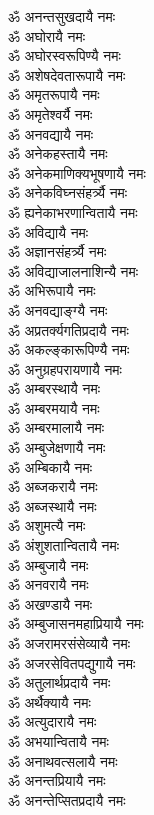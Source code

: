 \begin{flushleft}
\begin{multicols}{2}
ॐ अनन्तसुखदायै नमः\\
ॐ अघोरायै नमः\\
ॐ अघोरस्वरूपिण्यै नमः\\
ॐ अशेषदेवतारूपायै नमः\\
ॐ अमृतरूपायै नमः\\
ॐ अमृतेश्वर्यै नमः\\
ॐ अनवद्यायै नमः\\
ॐ अनेकहस्तायै नमः\hfill{}\\
ॐ अनेकमाणिक्यभूषणायै नमः\\
ॐ अनेकविघ्नसंहर्त्र्यै नमः\\
ॐ ह्यनेकाभरणान्वितायै नमः\\
ॐ अविद्यायै नमः\\
ॐ अज्ञानसंहर्त्र्यै नमः\\
ॐ अविद्याजालनाशिन्यै नमः\\
ॐ अभिरूपायै नमः\\
ॐ अनवद्याङ्ग्यै नमः\\
ॐ अप्रतर्क्यगतिप्रदायै नमः\\
ॐ अकल्ङ्कारूपिण्यै नमः\hfill{}\\
ॐ अनुग्रहपरायणायै नमः\\
ॐ अम्बरस्थायै नमः\\
ॐ अम्बरमयायै नमः\\
ॐ अम्बरमालायै नमः\\
ॐ अम्बुजेक्षणायै नमः\\
ॐ अम्बिकायै नमः\\
ॐ अब्जकरायै नमः\\
ॐ अब्जस्थायै नमः\\
ॐ अशुमत्यै नमः\\
ॐ अंशुशतान्वितायै नमः\hfill{}\\
ॐ अम्बुजायै नमः\\
ॐ अनवरायै नमः\\
ॐ अखण्डायै नमः\\
ॐ अम्बुजासनमहाप्रियायै नमः\\
ॐ अजरामरसंसेव्यायै नमः\\
ॐ अजरसेवितपद्युगायै नमः\\
ॐ अतुलार्थप्रदायै नमः\\
ॐ अर्थैक्यायै नमः\\
ॐ अत्युदारायै नमः\\
ॐ अभयान्वितायै नमः\hfill{}\\
ॐ अनाथवत्सलायै नमः\\
ॐ अनन्तप्रियायै नमः\\
ॐ अनन्तेप्सितप्रदायै नमः\\

\end{multicols}
\end{flushleft}
